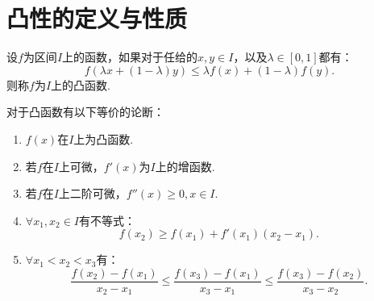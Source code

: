 \section{凸性的定义与性质}

\begin{definition}
	设$f$为区间$I$上的函数，如果对于任给的$x,y\in I$，以及$\lambda\in [0,1]$都有：
	\begin{equation}
		f\left(\lambda x+(1-\lambda)y\right) \leq \lambda f(x)+(1-\lambda)f(y).
	\end{equation}
	则称$f$为$I$上的凸函数.
\end{definition}

\begin{theorem}
	对于凸函数有以下等价的论断：
	\begin{enumerate}
		\item $f(x)$在$I$上为凸函数.
		\item 若$f$在$I$上可微，$f'(x)$为$I$上的增函数.
		\item 若$f$在$I$上二阶可微，$f''(x)\geq 0,x\in I.$
		\item $\forall x_1,x_2\in I$有不等式：
		\begin{equation}
			f(x_2)\geq f(x_1)+f'(x_1)(x_2-x_1).
		\end{equation}
		\item $\forall x_1<x_2<x_3$有：
		\begin{equation}
			\dfrac{f(x_2)-f(x_1)}{x_2-x_1}\leq\dfrac{f(x_3)-f(x_1)}{x_3-x_1}\leq\dfrac{f(x_3)-f(x_2)}{x_3-x_2}.
		\end{equation}
	\end{enumerate}
\end{theorem}